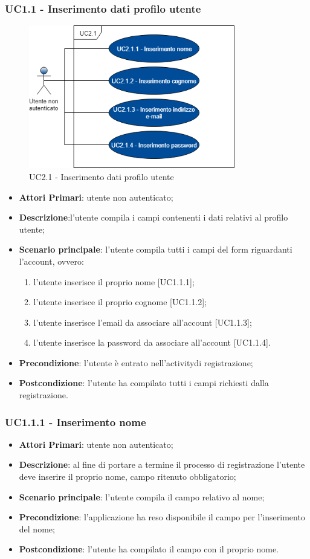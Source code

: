 \subsubsection{UC1.1 - Inserimento dati profilo utente}
\begin{figure}[h]
	\includegraphics[width=9cm]{res/images/UC2-1Inserimento.png}
	\centering
	\caption{UC2.1 - Inserimento dati profilo utente}
\end{figure}
\begin{itemize}
	\item \textbf{Attori Primari}: utente non autenticato;
	\item \textbf{Descrizione}:l'utente compila i campi contenenti i dati relativi al profilo utente;
	\item \textbf{Scenario principale}: l'utente compila tutti i campi del form riguardanti l'account, ovvero:
		\begin{enumerate}
			\item l'utente inserisce il proprio nome [UC1.1.1];
			\item l'utente inserisce il proprio cognome [UC1.1.2];
			\item l'utente inserisce l'email da associare all'account [UC1.1.3];
			\item l'utente inserisce la password da associare all'account [UC1.1.4].
		\end{enumerate}
	\item \textbf{Precondizione}: l'utente è entrato nell'activity\glosp di registrazione;
	\item \textbf{Postcondizione}: l'utente ha compilato tutti i campi richiesti dalla registrazione.
\end{itemize}
\subsubsection{UC1.1.1 - Inserimento nome}
\begin{itemize}
	\item \textbf{Attori Primari}: utente non autenticato;
	\item \textbf{Descrizione}: al fine di portare a termine il processo di registrazione l'utente deve inserire il proprio nome, campo ritenuto obbligatorio;
	\item \textbf{Scenario principale}: l'utente compila il campo relativo al nome;	
	\item \textbf{Precondizione}: l'applicazione ha reso disponibile il campo per l'inserimento del nome;
	\item \textbf{Postcondizione}: l'utente ha compilato il campo con il proprio nome.	
\end{itemize}
